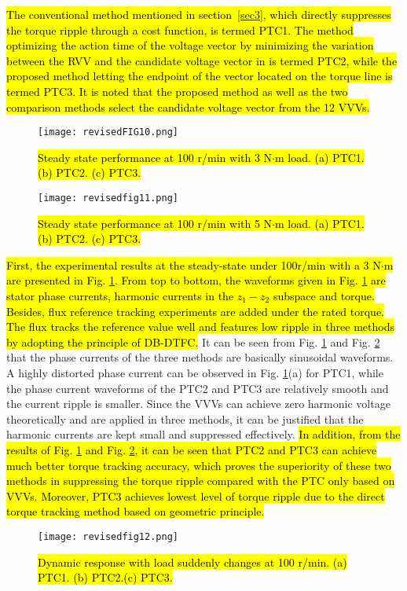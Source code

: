 \documentclass[sn-basic]{sn-jnl}
\theoremstyle{thmstyleone}%
\theoremstyle{thmstyletwo}%
\theoremstyle{thmstylethree}%
\theoremstyle{thmstyleone}%
\begin{document}
\hl{The conventional method mentioned in section~{\ref{sec3}}, which directly suppresses the torque ripple through a cost function, is termed PTC1. The method optimizing the action time of the voltage vector by minimizing the variation between the RVV and the candidate voltage vector in {\cite{7892874}} is termed PTC2, while the proposed method letting the endpoint of the vector located on the torque line is termed PTC3. It is noted that the proposed method as well as the two comparison methods select the candidate voltage
vector from the 12 VVVs.} 


 \begin{figure}[h]
\centering
\texttt{[image: revisedFIG10.png]}
\caption{\hl{Steady state performance at 100 r/min with 3 N$\cdot$m load. (a) PTC1. (b) PTC2. (c) PTC3.}}
\label{fig_10}
\end{figure}



\begin{figure}[h]
\centering
\texttt{[image: revisedfig11.png]}
\caption{\hl{Steady state performance at 100 r/min with 5 N$\cdot$m load. (a) PTC1. (b) PTC2. (c) PTC3.
  }}
\label{fig_11}
\end{figure}


 \hl{First, the experimental results at the steady-state under 100r/min with a 3 N$\cdot$m are presented in Fig. {\ref{fig_10}}. From top to bottom, the waveforms given in Fig. {\ref{fig_10}} are stator phase currents, harmonic currents in the ${z_1-z_2}$ subspace and torque. Besides, flux reference tracking experiments are added under the rated torque. The flux tracks the reference value well and features low ripple in three methods by adopting the principle of DB-DTFC.} It can be seen from Fig. {\ref{fig_10}} and Fig. {\ref{fig_11}} that the phase currents of the three methods are basically sinusoidal waveforms. A highly distorted phase current can be observed in Fig. {\ref{fig_10}}(a) for PTC1, while the phase current waveforms of the PTC2 and PTC3 are relatively smooth and the current ripple is smaller. Since the VVVs can achieve zero harmonic voltage theoretically and are applied in three methods, it can be justified that the harmonic currents are kept small and suppressed effectively. \hl{In addition, from the results of Fig. {\ref{fig_10}} and Fig. {\ref{fig_11}}, it can be seen that PTC2 and PTC3 can achieve much better torque tracking accuracy, which proves the superiority of these two methods in suppressing the torque ripple compared with the PTC only based on VVVs. 
 Moreover, PTC3 achieves lowest level of torque ripple due to the direct torque tracking method based on geometric principle.}
\begin{figure}[h]
\centering
\texttt{[image: revisedfig12.png]}
\caption{\hl{Dynamic response with load suddenly changes at 100 r/min. (a) PTC1. (b) PTC2.(c) PTC3.}}
\label{fig_12}
\end{figure}
\end{document}
